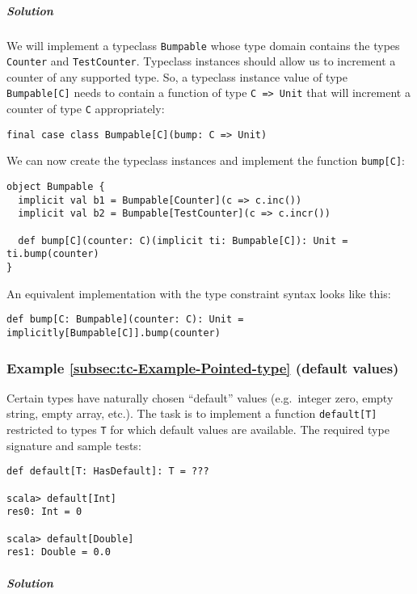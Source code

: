 \subparagraph{Solution}

We will implement a typeclass \lstinline!Bumpable! whose type domain
contains the types \lstinline!Counter! and \lstinline!TestCounter!.
Typeclass instances should allow us to increment a counter of any
supported type. So, a typeclass instance value of type \lstinline!Bumpable[C]!
needs to contain a function of type \lstinline!C => Unit! that will
increment a counter of type \lstinline!C! appropriately:
\begin{lstlisting}
final case class Bumpable[C](bump: C => Unit)
\end{lstlisting}
We can now create the typeclass instances and implement the function
\lstinline!bump[C]!:
\begin{lstlisting}
object Bumpable {
  implicit val b1 = Bumpable[Counter](c => c.inc())
  implicit val b2 = Bumpable[TestCounter](c => c.incr())
  
  def bump[C](counter: C)(implicit ti: Bumpable[C]): Unit = ti.bump(counter)
}
\end{lstlisting}
An equivalent implementation with the type constraint syntax looks
like this:
\begin{lstlisting}
def bump[C: Bumpable](counter: C): Unit = implicitly[Bumpable[C]].bump(counter)
\end{lstlisting}


\subsubsection{Example \label{subsec:tc-Example-Pointed-type}\ref{subsec:tc-Example-Pointed-type}
(default values)}

Certain types have naturally chosen ``default'' values (e.g.~integer
zero, empty string, empty array, etc.). The task is to implement a
function \lstinline!default[T]! restricted to types \lstinline!T!
for which default values are available. The required type signature
and sample tests:
\begin{lstlisting}
def default[T: HasDefault]: T = ???

scala> default[Int]
res0: Int = 0

scala> default[Double]
res1: Double = 0.0
\end{lstlisting}


\subparagraph{Solution}

